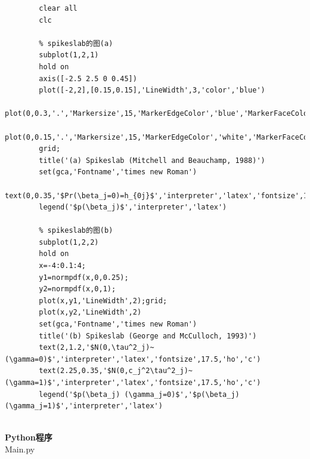 \documentclass[12pt]{article} %
\begin{document}
	\begin{lstlisting}
		clear all
		clc
		
		% spikeslab的图(a)
		subplot(1,2,1)
		hold on
		axis([-2.5 2.5 0 0.45])
		plot([-2,2],[0.15,0.15],'LineWidth',3,'color','blue')
		plot(0,0.3,'.','Markersize',15,'MarkerEdgeColor','blue','MarkerFaceColor','black');
		plot(0,0.15,'.','Markersize',15,'MarkerEdgeColor','white','MarkerFaceColor','black');
		grid;
		title('(a) Spikeslab (Mitchell and Beauchamp, 1988)')
		set(gca,'Fontname','times new Roman')
		text(0,0.35,'$Pr(\beta_j=0)=h_{0j}$','interpreter','latex','fontsize',17.5,'ho','c')
		legend('$p(\beta_j)$','interpreter','latex')
		
		% spikeslab的图(b)
		subplot(1,2,2)
		hold on
		x=-4:0.1:4;
		y1=normpdf(x,0,0.25);
		y2=normpdf(x,0,1);
		plot(x,y1,'LineWidth',2);grid;
		plot(x,y2,'LineWidth',2)
		set(gca,'Fontname','times new Roman')
		title('(b) Spikeslab (George and McCulloch, 1993)')
		text(2,1.2,'$N(0,\tau^2_j)~ (\gamma=0)$','interpreter','latex','fontsize',17.5,'ho','c')
		text(2.25,0.35,'$N(0,c_j^2\tau^2_j)~ (\gamma=1)$','interpreter','latex','fontsize',17.5,'ho','c')
		legend('$p(\beta_j) (\gamma_j=0)$','$p(\beta_j) (\gamma_j=1)$','interpreter','latex')
	\end{lstlisting}
	
	
	~\\
	\textbf{Python程序} \\
	Main.py
	
\end{document}
